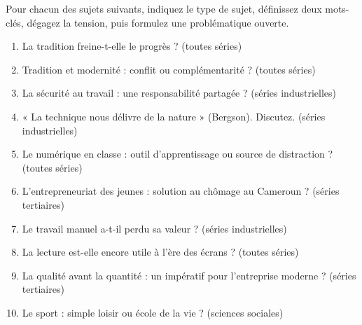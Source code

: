 \documentclass[11pt]{article}
\begin{document}
\begin{exercice}
Pour chacun des sujets suivants, indiquez le type de sujet, définissez deux mots-clés, dégagez la tension, puis formulez une problématique ouverte.
\begin{enumerate}
\item La tradition freine-t-elle le progrès ? (toutes séries)
\item Tradition et modernité : conflit ou complémentarité ? (toutes séries)
\item La sécurité au travail : une responsabilité partagée ? (séries industrielles)
\item « La technique nous délivre de la nature » (Bergson). Discutez. (séries industrielles)
\item Le numérique en classe : outil d'apprentissage ou source de distraction ? (toutes séries)
\item L'entrepreneuriat des jeunes : solution au chômage au Cameroun ? (séries tertiaires)
\item Le travail manuel a-t-il perdu sa valeur ? (séries industrielles)
\item La lecture est-elle encore utile à l'ère des écrans ? (toutes séries)
\item La qualité avant la quantité : un impératif pour l'entreprise moderne ? (séries tertiaires)
\item Le sport : simple loisir ou école de la vie ? (sciences sociales)
\end{enumerate}
\end{exercice}
\end{document}
